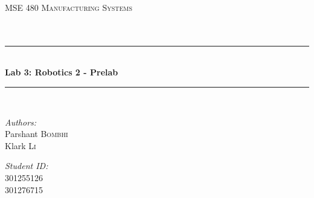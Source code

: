\documentclass[12pt]{article}
\begin{document}
\begin{titlepage}

\newcommand{\HRule}{\rule{\linewidth}{0.5mm}} %

\center %
 

\textsc{\LARGE MSE 480 Manufacturing Systems}\\[1.5cm] %
\textsc{\Large }\\[0.5cm] %
\textsc{\large }\\[0.5cm] %


\HRule \\[0.4cm]
{ \huge \bfseries Lab 3: Robotics 2 - Prelab}\\[0.4cm] %
\HRule \\[1.5cm]
 

\begin{minipage}{0.4\textwidth}
    \begin{flushleft} \large
        \emph{Authors:}\\
        Parshant \textsc{Bombhi}\\
        Klark \textsc{Li}
    \end{flushleft}
\end{minipage}
\hfill
\begin{minipage}{0.4\textwidth}
    \begin{flushright} \large
        \emph{Student ID:} \\
        301255126\\
        301276715
    \end{flushright}
\end{minipage}
\vspace{10mm}


\end{titlepage}
\end{document}
